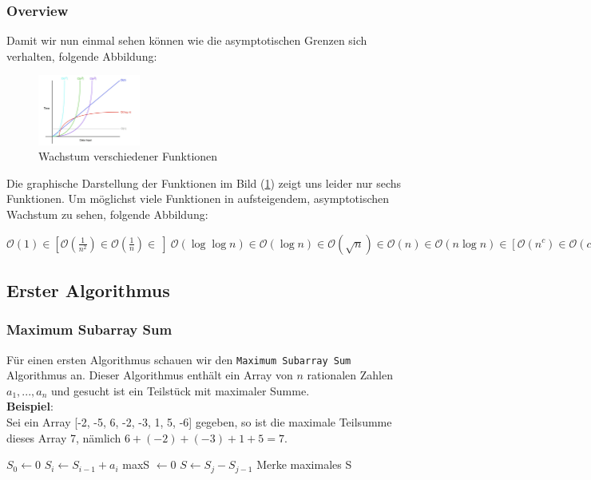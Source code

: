\documentclass[a4paper]{article}
\begin{document}
    \subsubsection{Overview}
    Damit wir nun einmal sehen können wie die asymptotischen Grenzen sich verhalten, folgende Abbildung: 
    \begin{figure}[h]
        \centering
        \includegraphics[width=0.3\textwidth]{Pictures/big-o-notation.jpg}
        \caption{Wachstum verschiedener Funktionen}
        \label{fig: WachstumBigO}
    \end{figure}
    Die graphische Darstellung der Funktionen im Bild (\ref{fig: WachstumBigO}) zeigt uns leider nur sechs Funktionen. 
    Um möglichst viele Funktionen in aufsteigendem, asymptotischen Wachstum zu sehen, folgende Abbildung:

    $\mathcal{O}(1) \in [\mathcal{O}(\frac{1}{n^2}) \in \mathcal{O}(\frac{1}{n}) \in \ ] \  \mathcal{O}(\log \log n)\in \mathcal{O}(\log n) \in \mathcal{O}(\sqrt{n}) \in \mathcal{O}(n) \in \mathcal{O}(n\log n) \in [\mathcal{O}({n^c}) \in \mathcal{O}(c^n) \in \ ] \mathcal{O}(n^2) \in \mathcal{O}(2^n) \in \mathcal{O}(2^{n^{2}}) \in \mathcal{O}(n!) $

\newpage
\subsection{Erster Algorithmus}
    \subsubsection{Maximum Subarray Sum}
    Für einen ersten Algorithmus schauen wir den \texttt{Maximum Subarray Sum} Algorithmus an. Dieser Algorithmus enthält ein Array von $n$ rationalen Zahlen $a_1,..., a_n$ und gesucht ist ein Teilstück mit maximaler Summe.  \\
    \textbf{Beispiel}: \\
    Sei ein Array [-2, -5, 6, -2, -3, 1, 5, -6] gegeben, so ist die maximale Teilsumme dieses Array 7, nämlich $ 6 + (-2) + (-3) + 1 + 5 = 7$. \\
      
\begin{algorithm}
    \caption{Maximum Subarray Sum $(a_1,..., a_n)$}
    \label{alg:MSS-1}
    \begin{algorithmic}[1]
    \State $S_0 \gets 0$ 
        \State $S_i \gets S_{i-1} + a_i$ 
    \EndFor
    \State maxS $\gets 0$
            \State $S \gets S_j - S_{j-1}$ 
           \State Merke maximales S
        \EndFor
    \EndFor
    \EndFunction

    \end{algorithmic}
    
\end{algorithm}
\end{document}

